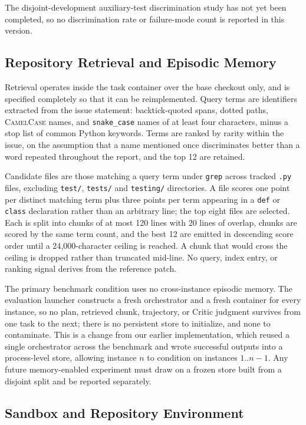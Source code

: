 \documentclass[journal]{IEEEtran}
\begin{document}
The disjoint-development auxiliary-test discrimination study has not yet been completed, so no discrimination rate or failure-mode count is reported in this version.

\subsection{Repository Retrieval and Episodic Memory}

Retrieval operates inside the task container over the base checkout only, and is specified completely so that it can be reimplemented. Query terms are identifiers extracted from the issue statement: backtick-quoted spans, dotted paths, \textsc{CamelCase} names, and \texttt{snake\_case} names of at least four characters, minus a stop list of common Python keywords. Terms are ranked by rarity within the issue, on the assumption that a name mentioned once discriminates better than a word repeated throughout the report, and the top 12 are retained.

Candidate files are those matching a query term under \texttt{grep} across tracked \texttt{.py} files, excluding \texttt{test/}, \texttt{tests/} and \texttt{testing/} directories. A file scores one point per distinct matching term plus three points per term appearing in a \texttt{def} or \texttt{class} declaration rather than an arbitrary line; the top eight files are selected. Each is split into chunks of at most 120 lines with 20 lines of overlap, chunks are scored by the same term count, and the best 12 are emitted in descending score order until a 24{,}000-character ceiling is reached. A chunk that would cross the ceiling is dropped rather than truncated mid-line. No query, index entry, or ranking signal derives from the reference patch.

The primary benchmark condition uses no cross-instance episodic memory. The evaluation launcher constructs a fresh orchestrator and a fresh container for every instance, so no plan, retrieved chunk, trajectory, or Critic judgment survives from one task to the next; there is no persistent store to initialize, and none to contaminate. This is a change from our earlier implementation, which reused a single orchestrator across the benchmark and wrote successful outputs into a process-level store, allowing instance $n$ to condition on instances $1..n-1$. Any future memory-enabled experiment must draw on a frozen store built from a disjoint split and be reported separately.

\subsection{Sandbox and Repository Environment}
\end{document}
